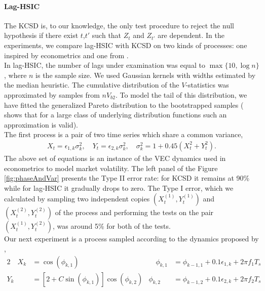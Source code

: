 \paragraph{Lag-HSIC}
The KCSD  \cite{besserve_statistical_2013} is, to our knowledge, the only test procedure to reject the null hypothesis if there exist $t$,$t'$ such that $Z_t$ and $Z_{t'}$ are dependent. In the experiments, we compare lag-HSIC with KCSD on two kinds of processes: one  inspired by econometrics and one from \cite{besserve_statistical_2013}.\\ 
In lag-HSIC, the number of lags under examination was equal to $\max\{10,\log n\}$, where $n$ is the sample size. We used Gaussian kernels with widths estimated by the median heuristic. The cumulative distribution of the $V$-statistics was approximated by samples from $n V_{b2}$. To model the tail of this distribution, we have fitted the generalized Pareto distribution to the bootstrapped samples (\cite{pickands1975statistical} shows that for a large class of underlying distribution functions such an approximation is valid).\\
The first process is a pair of two time series which share a common variance,   
\begin{align}
\label{eq:dynamics2}
 X_t = \epsilon_{1,k} \sigma_k^2, \quad  Y_t = \epsilon_{2,k}  \sigma_k^2,  \quad \sigma_k^2 = 1 + 0.45(X_t^2 + Y_t^2 ).
\end{align}
The above set of equations is an instance of the VEC dynamics \cite{bauwens_multivariate_2006} used in econometrics to model market volatility. The left panel of the Figure \ref{fig:phaseAndVar} presents the Type II error rate: for KCSD it remains at 90\% while for lag-HSIC it gradually drops to zero. The Type I error, which we calculated by sampling two independent copies $(X^{(1)}_{t},Y^{(1)}_{t})$ and $(X^{(2)}_{t},Y^{(2)}_{t})$ of the process and performing the tests on the pair $(X^{(1)}_{t},Y^{(2)}_{t})$, was around 5\% for both of the tests.\\
Our next experiment is a process sampled according to the dynamics proposed by \cite{besserve_statistical_2013},      
\begin{alignat}{2}
  \quad X_k &= \cos(\phi_{k,1})   &\quad  \phi_{k,1} &= \phi_{k-1,1} + 0.1\epsilon_{1,k} + 2 \pi f_1 T_s \label{eg:dymamics1a} \\  
  Y_k &= [2+C\sin(\phi_{k,1})]\cos(\phi_{k,2})  &   \phi_{k,2} &= \phi_{k-1,2} + 0.1\epsilon_{2,k} + 2 \pi f_2 T_s \label{eg:dymamics1b}
\end{alignat}
